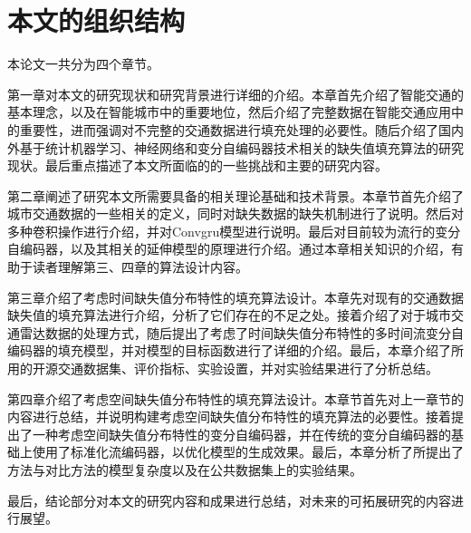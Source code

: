 \section{本文的组织结构}

本论文一共分为四个章节。

第一章对本文的研究现状和研究背景进行详细的介绍。本章首先介绍了智能交通的基本理念，以及在智能城市中的重要地位，然后介绍了完整数据在智能交通应用中的重要性，进而强调对不完整的交通数据进行填充处理的必要性。随后介绍了国内外基于统计机器学习、神经网络和变分自编码器技术相关的缺失值填充算法的研究现状。最后重点描述了本文所面临的的一些挑战和主要的研究内容。

第二章阐述了研究本文所需要具备的相关理论基础和技术背景。本章节首先介绍了城市交通数据的一些相关的定义，同时对缺失数据的缺失机制进行了说明。然后对多种卷积操作进行介绍，并对Convgru模型进行说明。最后对目前较为流行的变分自编码器，以及其相关的延伸模型的原理进行介绍。通过本章相关知识的介绍，有助于读者理解第三、四章的算法设计内容。

第三章介绍了考虑时间缺失值分布特性的填充算法设计。本章先对现有的交通数据缺失值的填充算法进行介绍，分析了它们存在的不足之处。接着介绍了对于城市交通雷达数据的处理方式，随后提出了考虑了时间缺失值分布特性的多时间流变分自编码器的填充模型，并对模型的目标函数进行了详细的介绍。最后，本章介绍了所用的开源交通数据集、评价指标、实验设置，并对实验结果进行了分析总结。

第四章介绍了考虑空间缺失值分布特性的填充算法设计。本章节首先对上一章节的内容进行总结，并说明构建考虑空间缺失值分布特性的填充算法的必要性。接着提出了一种考虑空间缺失值分布特性的变分自编码器，并在传统的变分自编码器的基础上使用了标准化流编码器，以优化模型的生成效果。最后，本章分析了所提出了方法与对比方法的模型复杂度以及在公共数据集上的实验结果。

最后，结论部分对本文的研究内容和成果进行总结，对未来的可拓展研究的内容进行展望。


